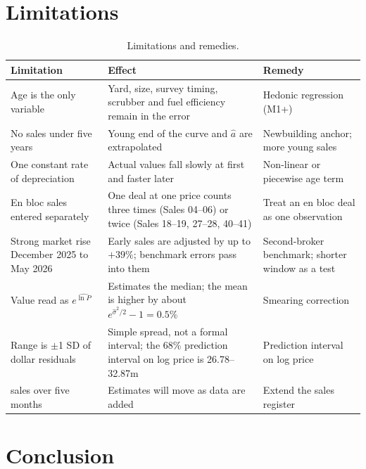 \documentclass[11pt,a4paper]{article}
\newcommand{\usd}[1]{\text{US\$}#1}
\begin{document}
\section{Limitations}

\begin{table}[h]
\centering
\caption{Limitations and remedies.}
\label{tab:limits}
\small
\begin{tabularx}{\linewidth}{@{}>{\raggedright\arraybackslash}X >{\raggedright\arraybackslash}X >{\raggedright\arraybackslash}X@{}}
\toprule
Limitation & Effect & Remedy \\
\midrule
Age is the only variable & Yard, size, survey timing, scrubber and fuel efficiency remain in the error & Hedonic regression (M1+) \\
No sales under five years & Young end of the curve and $\hat a$ are extrapolated & Newbuilding anchor; more young sales \\
One constant rate of depreciation & Actual values fall slowly at first and faster later & Non-linear or piecewise age term \\
En bloc sales entered separately & One deal at one price counts three times (Sales 04--06) or twice (Sales 18--19, 27--28, 40--41) & Treat an en bloc deal as one observation \\
Strong market rise December 2025 to May 2026 & Early sales are adjusted by up to $+39\%$; benchmark errors pass into them & Second-broker benchmark; shorter window as a test \\
Value read as $e^{\widehat{\ln P}}$ & Estimates the median; the mean is higher by about $e^{\hat\sigma^2/2} - 1 = 0.5\%$ & Smearing correction \citep{Duan1983} \\
Range is $\pm$1 SD of dollar residuals & Simple spread, not a formal interval; the 68\% prediction interval on log price is \usd{26.78}--32.87m & Prediction interval on log price \\
43 sales over five months & Estimates will move as data are added & Extend the sales register \\
\bottomrule
\end{tabularx}
\end{table}

\section{Conclusion}
\end{document}
